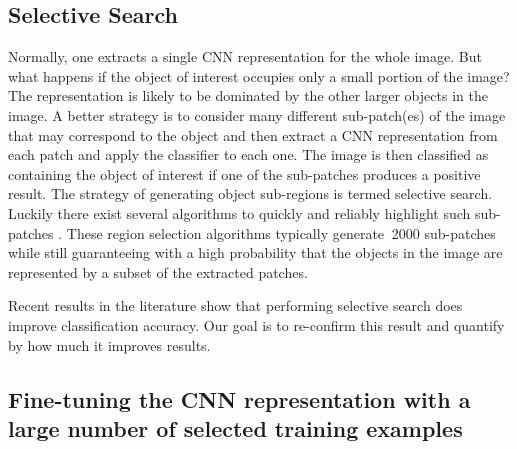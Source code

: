 \documentclass[a4paper]{article}
\begin{document}
\subsection{Selective Search}

Normally, one extracts a single CNN representation for the whole
image. But what happens if the object of interest occupies only a
small portion of the image? The representation is likely to be
dominated by the other larger objects in the image. A better strategy
is to consider many different sub-patch(es) of the image that may
correspond to the object and then extract a CNN representation from
each patch and apply the classifier to each one. The image is then
classified as containing the object of interest if one of the
sub-patches produces a positive result. The strategy of generating
object sub-regions is termed selective search. Luckily there exist
several algorithms to quickly and reliably highlight such sub-patches
\cite{Sande:iccv:11}. These region selection algorithms typically
generate $~$2000 sub-patches while still guaranteeing with a high
probability that the objects in the image are represented by a subset
of the extracted patches.

Recent results in the literature \cite{Girshick:cvpr:14} show that
performing selective search does improve classification accuracy. Our
goal is to re-confirm this result and quantify by how much it improves
results.

\subsection{Fine-tuning the CNN representation with a large number
    of selected training examples} 
\end{document}
